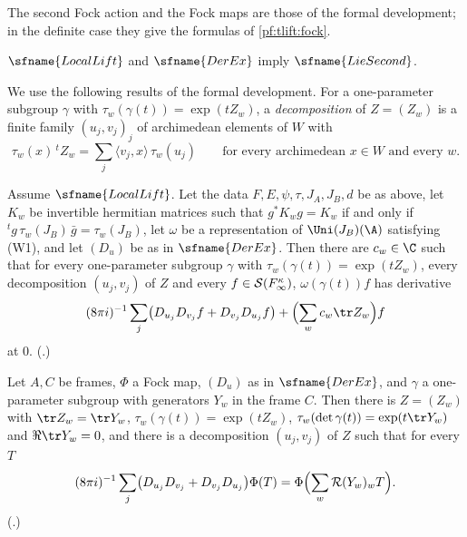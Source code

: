 The second Fock action and the Fock maps are those of the formal development; in the definite case they give the formulas of
\cref{pf:tlift:fock}.

\begin{theorem}\label{pf:sh-misc:lie2}
$\sfname{LocalLift}$ and $\sfname{DerEx}$ imply $\sfname{LieSecond}$.
\end{theorem}

We use the following results of the formal development. For a one-parameter subgroup $\gamma$ with $\tau_w(\gamma(t))=\exp(tZ_w)$, a
\emph{decomposition} of $Z=(Z_w)$ is a finite family $(u_j,v_j)_j$ of archimedean elements of $W$ with
\begin{equation}\label{eq:pf:sh-misc:decomp}
\tau_w(x)\,{}^tZ_w=\sum_j\langle v_j,x\rangle\,\tau_w(u_j)\qquad\text{for every archimedean }x\in W\text{ and every }w .
\end{equation}

\begin{lemma}\label{pf:sh-misc:main2}
Assume $\sfname{LocalLift}$. Let the data $F,E,\psi,\tau,J_A,J_B,d$ be as above, let $K_w$ be invertible hermitian matrices such that
$g^*K_wg=K_w$ if and only if ${}^tg\,\tau_w(J_B)\,\bar g=\tau_w(J_B)$, let $\omega$ be a representation of $\Uni(J_B)(\A)$ satisfying
(W1), and let $(D_u)$ be as in $\sfname{DerEx}$. Then there are $c_w\in\C$ such that for every one-parameter subgroup $\gamma$ with
$\tau_w(\gamma(t))=\exp(tZ_w)$, every decomposition $(u_j,v_j)$ of $Z$ and every $f\in\mathcal S(F_\infty^\kappa)$, $\omega(\gamma(t))f$ has
derivative
\[
(8\pi i)^{-1}\sum_j\bigl(D_{u_j}D_{v_j}f+D_{v_j}D_{u_j}f\bigr)+\Bigl(\sum_wc_w\tr Z_w\Bigr)f
\]
at $0$. \textup{(}.\textup{)}
\end{lemma}

\begin{lemma}\label{pf:sh-misc:fockdata}
Let $A,C$ be frames, $\Phi$ a Fock map, $(D_u)$ as in $\sfname{DerEx}$, and $\gamma$ a one-parameter subgroup with generators $Y_w$ in the frame
$C$. Then there is $Z=(Z_w)$ with $\tr Z_w=\tr Y_w$, $\tau_w(\gamma(t))=\exp(tZ_w)$, $\tau_w(\det\gamma(t))=\exp(t\tr Y_w)$ and
$\Re\tr Y_w=0$, and there is a decomposition $(u_j,v_j)$ of $Z$ such that for every $T$
\[
(8\pi i)^{-1}\sum_j\bigl(D_{u_j}D_{v_j}+D_{v_j}D_{u_j}\bigr)\Phi(T)=\Phi\Bigl(\sum_w\mathcal R(Y_w)_wT\Bigr).
\]
\textup{(}.\textup{)}
\end{lemma}

